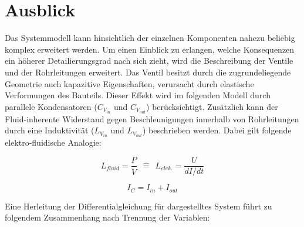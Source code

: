 \documentclass[fontsize=12pt, a4paper]{scrartcl}
\let\stdsection\section 	%
\renewcommand\section{\newpage\stdsection}
\begin{document}
\section{Ausblick}

Das Systemmodell kann hinsichtlich der einzelnen Komponenten nahezu beliebig komplex erweitert werden. Um einen Einblick zu erlangen, welche Konsequenzen ein höherer Detailierungsgrad nach sich zieht, wird die Beschreibung der Ventile und der Rohrleitungen erweitert. Das Ventil besitzt durch die zugrundeliegende Geometrie auch kapazitive Eigenschaften, verursacht durch elastische Verformungen des Bauteils. Dieser Effekt wird im folgenden Modell durch parallele Kondensatoren ($C_{V_{in}}$ und $C_{V_{out}}$) berücksichtigt. Zusätzlich kann der Fluid-inherente Widerstand gegen Beschleunigungen innerhalb von Rohrleitungen durch eine Induktivität ($L_{V_{in}}$ und $L_{V_{out}}$) beschrieben werden. Dabei gilt folgende elektro-fluidische Analogie:


\begin{equation}
	L_{fluid} = \frac{P}{\ddot{V}} \:\:\widehat{=}\:\: L_{elek.} = \frac{U}{dI/dt}
\end{equation}

\begin{equation}
	I_{C} = I_{in} + I_{out}
\end{equation}

\begin{center}
	
\end{center}

Eine Herleitung der Differentialgleichung für dargestelltes System führt zu folgendem Zusammenhang nach Trennung der Variablen:
\end{document}
